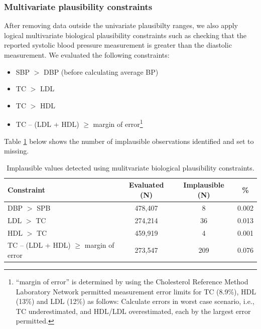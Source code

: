 \documentclass[12pt]{article}
\begin{document}
\begin{appendix}
\begin{refsection}
    \subsubsection{Multivariate plausibility constraints}
    After removing data outside the univariate plausibilty ranges, we also apply logical multivariate biological plausibility constraints such as checking that the reported systolic blood pressure measurement is greater than the diastolic measurement. We evaluated the following constraints:
    \begin{itemize}
        \item SBP $>$ DBP (before calculating average BP) 
        \item TC $>$ LDL 
        \item TC $>$ HDL
        \item TC – (LDL + HDL) $\geq$ margin of error\footnote{“margin of error” is determined by using the Cholesterol Reference Method Laboratory Network permitted measurement error limits for TC (8.9\%), HDL (13\%) and LDL (12\%) as follows: Calculate errors in worst case scenario, i.e., TC underestimated, and HDL/LDL overestimated, each by the largest error permitted.}
    \end{itemize}
    Table \ref{tab:mv_constraints} below shows the number of implausible observations identified and set to missing.
    \begin{table}[H]
        \centering
        \caption{Implausible values detected using mulitvariate biological plausibility constraints.}
        \label{tab:mv_constraints}
        \begin{tabular}{lccc}
            \toprule
            Constraint & Evaluated (N) & Implausible (N) & \% \\
            \midrule
            DBP $>$ SPB & 478,407 & 8 & 0.002\\
            LDL $>$ TC & 274,214 & 36 & 0.013\\
            HDL $>$ TC & 459,919 & 4 & 0.001\\
            TC – (LDL + HDL) $\geq$ margin of error & 273,547 & 209 & 0.076\\
            \bottomrule
            \end{tabular}
    \end{table}


\end{refsection}
\end{appendix}
\end{document}
